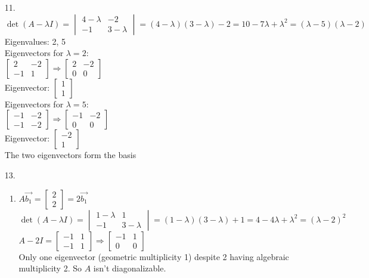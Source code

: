 \documentclass[leqno]{article}
\begin{document}
\begin{enumerate}
    \item[11.]
    $\det(A - \lambda I) = \begin{vmatrix}4 - \lambda & -2 \\ -1 & 3 - \lambda\end{vmatrix} = (4 - \lambda)(3 - \lambda) - 2 = 10 - 7\lambda + \lambda^2 = (\lambda - 5)(\lambda - 2)$\\
    Eigenvalues: 2, 5\\
    Eigenvectors for $\lambda = 2$:\\
    $\begin{bmatrix}2 & -2 \\ -1 & 1\end{bmatrix} \Rightarrow \begin{bmatrix}2 & -2 \\ 0 & 0\end{bmatrix}$\\
    Eigenvector: $\begin{bmatrix}1 \\ 1\end{bmatrix}$\\
    Eigenvectors for $\lambda = 5$:\\
    $\begin{bmatrix}-1 & -2 \\ -1 & -2\end{bmatrix} \Rightarrow \begin{bmatrix}-1 & -2 \\ 0 & 0\end{bmatrix}$\\
    Eigenvector: $\begin{bmatrix}-2 \\ 1\end{bmatrix}$\\
    The two eigenvectors form the basis

    \item[13.]
    \begin{enumerate}
        \item
        $A\Vec{b_1} = \begin{bmatrix}2 \\ 2\end{bmatrix} = 2\Vec{b_1}$\\
        $\det(A - \lambda I) = \begin{vmatrix}1 - \lambda & 1 \\ -1 & 3 - \lambda\end{vmatrix} = (1 - \lambda)(3 - \lambda) + 1 = 4 - 4\lambda + \lambda^2 = (\lambda - 2)^2$\\
        $A - 2I = \begin{bmatrix}-1 & 1 \\ -1 & 1\end{bmatrix} \Rightarrow \begin{bmatrix}-1 & 1 \\ 0 & 0\end{bmatrix}$\\
        Only one eigenvector (geometric multiplicity 1) despite 2 having algebraic multiplicity 2. So $A$ isn't diagonalizable.


\end{enumerate}
\end{enumerate}
\end{document}
